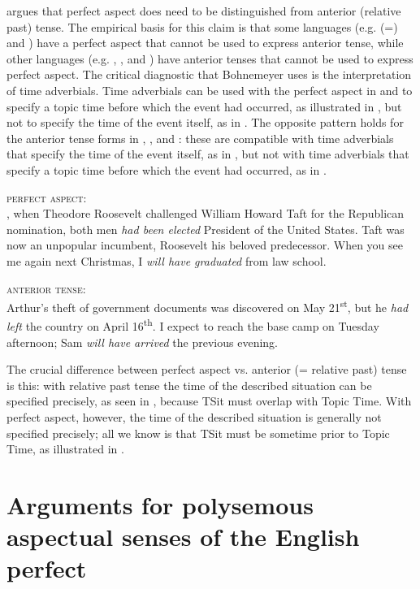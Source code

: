\newpage %
\citet{Bohnemeyer2014} argues that perfect aspect does need to be distinguished from anterior (relative past) tense. The empirical basis for this claim is that some languages (e.g.  (=) and ) have a perfect aspect that cannot be used to express anterior tense, while other languages (e.g. , , and ) have anterior tenses that cannot be used to express perfect aspect. The critical diagnostic that Bohnemeyer uses is the interpretation of time adverbials. Time adverbials can be used with the perfect aspect in  and  to specify a topic time before which the event had occurred, as illustrated in , but not to specify the time of the event itself, as in . The opposite pattern holds for the anterior tense forms in , , and : these are compatible with time adverbials that specify the time of the event itself, as in , but not with time adverbials that specify a topic time before which the event had occurred, as in .


\ea \label{ex:22.14}
\textsc{perfect aspect:}\\
, when Theodore Roosevelt challenged William Howard Taft for the Republican nomination, both men \textit{had been elected} President of the United States. Taft was now an unpopular incumbent, Roosevelt his beloved predecessor.
\ex  When you see me again next Christmas, I \textit{will have graduated} from law school.
\z
\z 

\ea \label{ex:22.15}
\textsc{anterior tense:}\\
\ea  Arthur’s theft of government documents was discovered on May 21\textsuperscript{st}, but he \textit{had left} the country on April 16\textsuperscript{th}.
\ex  I expect to reach the base camp on Tuesday afternoon; Sam \textit{will have arrived} the previous evening.
\z \z


The crucial difference between perfect aspect vs. anterior (= relative past) tense is this: with relative past tense the time of the described situation can be specified precisely, as seen in , because TSit must overlap with Topic Time. With perfect aspect, however, the time of the described situation is generally not specified precisely; all we know is that TSit must be sometime prior to Topic Time, as illustrated in .


\section{Arguments for polysemous aspectual senses of the English perfect}\label{sec:22.4}

